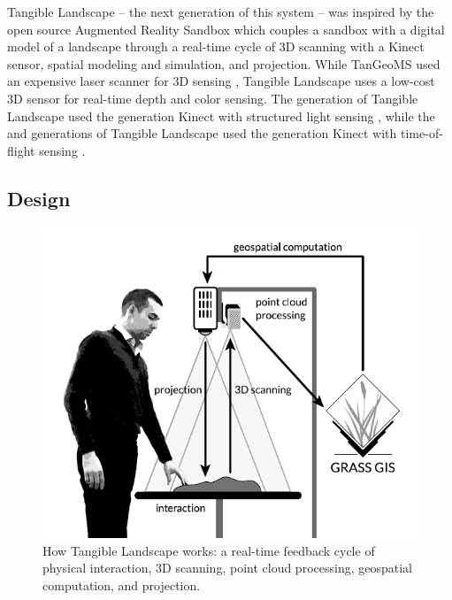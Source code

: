 \documentclass[prodmode,acmtochi]{acmsmall} %
\begin{document}
Tangible Landscape -- the next generation of this system -- was inspired by
the open source Augmented Reality Sandbox \cite{Kreylos2012}
which couples a sandbox with a digital model of a landscape 
through a real-time cycle of 3D scanning with a Kinect sensor, spatial modeling and simulation, and projection.
While TanGeoMS used an expensive laser scanner
for 3D sensing \cite{Tateosian2010}, 
Tangible Landscape uses a low-cost 3D sensor %
for real-time depth and color sensing. 
The  generation of Tangible Landscape \cite{Petrasova2014} 
used the  generation Kinect with structured light sensing \cite{Smisek2011}, 
while the   \cite{Petrasova2015} and  generations of Tangible Landscape 
used the  generation Kinect with time-of-flight sensing \cite{Bamji2015}. 


\subsection{Design}

\begin{figure}
\begin{center}
		\includegraphics{images/system_schema.pdf}
	\caption{How Tangible Landscape works: a real-time feedback cycle of physical interaction, 3D scanning, point cloud processing, geospatial computation, and projection.}
	\label{fig:system_schema}
\end{center}
\end{figure}
\end{document}
